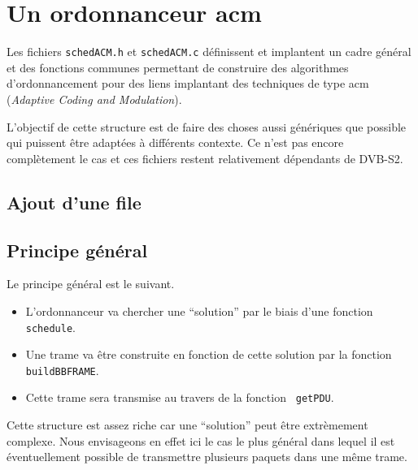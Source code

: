 %
\section{Un ordonnanceur {\sc acm}}

   Les fichiers {\tt schedACM.h} et {\tt schedACM.c} définissent et
implantent un cadre général et des fonctions communes permettant de
construire des algorithmes d'ordonnancement pour des liens implantant
des techniques de type {\sc acm} ({\em Adaptive Coding and
  Modulation}).

   L'objectif de cette structure est de faire des choses aussi
génériques que possible qui puissent être adaptées à différents
contexte. Ce n'est pas encore complètement le cas et ces fichiers
restent relativement dépendants de DVB-S2.

%
\subsection{Ajout d'une file}

%
\subsection{Principe général}

   Le principe général est le suivant.

\begin{itemize}
   \item L'ordonnanceur va chercher une ``solution'' par le biais d'une
   fonction {\tt schedule}.
   \item Une trame va être construite en fonction de cette solution
     par la fonction {\tt buildBBFRAME}.
   \item Cette trame sera transmise au travers de la fonction {\tt
     getPDU}.
\end{itemize}

   Cette structure est assez riche car une ``solution'' peut être
extrèmement complexe. Nous envisageons en effet ici le cas le plus
général dans lequel il est éventuellement possible de transmettre
plusieurs paquets dans une même trame.

